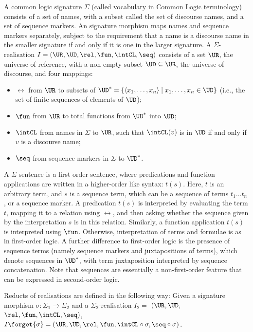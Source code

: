 \documentclass[10pt, a4paper]{isov2}
\begin{document}
\begin{definition}\label{CommonLogic}   
A common logic signature
$\Sigma$ (called vocabulary in Common Logic terminology) consists of a
set of names, with a subset called the set of discourse names, and a
set of sequence markers. An signature morphism maps
names and sequence markers separately, subject to the requirement
 that a name is a discourse
name in the smaller signature if and only if it is one in the larger signature.  A $\Sigma$-realisation $I=(\UR,\UD,\rel,\fun,\intCL,\seq)$ consists of a set $\UR$,
the universe of reference, with a non-empty subset $\UD\subseteq \UR$,
the universe of discourse, and four mappings:
  \begin{itemize}
   \item $\rel$ from $\UR$ to subsets of $\UD^* = \{ \langle x_1,\ldots,x_n\rangle \mid
x_1,\ldots,x_n \in \UD\}$ (i.e., the set of finite sequences of
elements of $\UD$);
   \item $\fun$ from $\UR$ to total functions from $\UD^*$ into $\UD$;
   \item $\intCL$ from names in $\Sigma$ to $\UR$, such that
$\intCL(v)$ is in $\UD$ if and only if $v$ is a discourse name;
   \item $\seq$ from sequence markers in $\Sigma$ to $\UD^*$.
  \end{itemize}  A $\Sigma$-sentence is a first-order
sentence, where predications and function applications are written
in a higher-order like syntax: $t(s)$.
Here, $t$ is an arbitrary term, and $s$ is a sequence term, which can
be a sequence of terms $t_1\ldots t_n$, or a sequence marker.
A predication $t(s)$ is interpreted by evaluating the term $t$,
mapping it to a relation using $\rel$, and then asking whether the sequence
given by the interpretation $s$ is in this relation.  
Similarly, a function application $t(s)$ is interpreted using $\fun$.
Otherwise, interpretation of terms and formulae is as in
first-order logic. 
A further
difference to first-order logic
is the presence of sequence terms (namely sequence markers and
juxtapositions of terms), which denote sequences in $\UD^*$, with term
juxtaposition interpreted by sequence concatenation.
Note that sequences are essentially a non-first-order feature that
can be expressed in second-order logic.

Reducts of realisations are defined in the following way: 
Given a signature morphism $\sigma:\Sigma_1\to\Sigma_2$ and a $\Sigma_2$-realisation
$I_2 =$ $(\UR,\UD,$ $\rel,\fun,\intCL,\seq)$, $I\forget{\sigma}=(\UR,\UD,\rel,\fun,\intCL\circ\sigma,\seq\circ\sigma)$. 


\end{definition}
\end{document}
